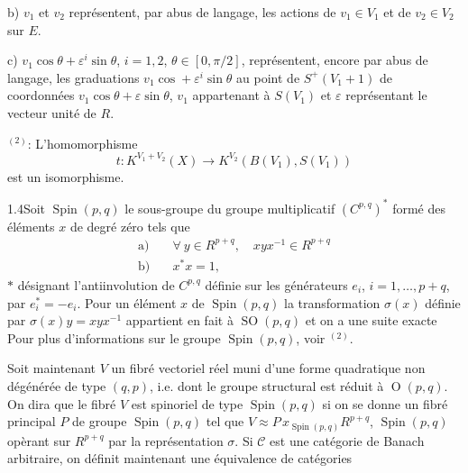 b) $v_1$ et $v_2$ représentent, par abus de langage, les actions de $v_1\in V_1$ et de $v_2\in V_2$ sur $E$.

c) $v_1\cos\theta+\varepsilon^i\sin\theta$, $i=1,2$, $\theta\in[0,\pi/2]$, représentent, encore par abus de langage, les graduations $v_1\cos+\varepsilon^i\sin\theta$ au point de $S^+(V_1+1)$ de coordonnées $v_1\cos\theta+\varepsilon\sin\theta$, $v_1$ appartenant à $S(V_1)$ et $\varepsilon$ représentant le vecteur unité de $R$.

 $^{(2)}$: L'homomorphisme
\[
t:K^{V_1+V_2}(X)\longrightarrow K^{V_2}(B(V_1),S(V_1))
\]
est un isomorphisme.

1.4\quad Soit $\operatorname{Spin}(p,q)$ le sous-groupe du groupe multiplicatif $(C^{p,q})^*$ formé des éléments $x$ de degré zéro tels que
\[
\begin{aligned}
\text{a)}\quad&\forall\ y\in R^{p+q},\quad xyx^{-1}\in R^{p+q}\\
\text{b)}\quad&x^*x=1,
\end{aligned}
\]
$*$ désignant l'antiinvolution de $C^{p,q}$ définie sur les générateurs $e_i$, $i=1,\ldots,p+q$, par $e_i^*=-e_i$.
Pour un élément $x$ de $\operatorname{Spin}(p,q)$ la transformation $\sigma(x)$ définie par $\sigma(x)y=xyx^{-1}$ appartient en fait à $\operatorname{SO}(p,q)$ et on a une suite exacte
Pour plus d'informations sur le groupe $\operatorname{Spin}(p,q)$, voir $^{(2)}$.

Soit maintenant $V$ un fibré vectoriel réel muni d'une forme quadratique non dégénérée de type $(q,p)$, i.e. dont le groupe structural est réduit à $\operatorname{O}(p,q)$. On dira que le fibré $V$ est spinoriel de type $\operatorname{Spin}(p,q)$ si on se donne un fibré principal $P$ de groupe $\operatorname{Spin}(p,q)$ tel que $V\approx P\,x_{\operatorname{Spin}(p,q)}R^{p+q}$, $\operatorname{Spin}(p,q)$ opèrant sur $R^{p+q}$ par la représentation $\sigma$. Si $\mathcal C$ est une catégorie de Banach arbitraire, on définit maintenant une équivalence de catégories
